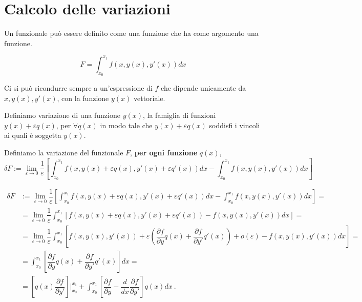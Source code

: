 
\chapter{Calcolo delle variazioni}

\begin{definition}[Funzionale] Un funzionale può essere definito come una funzione che ha come argomento una funzione.
\end{definition}

\begin{definition}
\begin{equation}
    F = \int_{x_0}^{x_1} f(x, y(x), y'(x)) dx
\end{equation}
\end{definition}

\noindent
{\color{red}
Ci si può ricondurre sempre a un'espressione di $f$ che dipende unicamente da $x, y(x), y'(x)$, con la funzione $y(x)$ vettoriale.
}

\begin{definition} Definiamo variazione di una funzione $y(x)$, la famiglia di funzioni $y(x) + \varepsilon q(x)$, per $\forall q(x)$ in modo tale che $y(x) + \varepsilon q(x)$ soddisfi i vincoli ai quali è soggetta $y(x)$.
\end{definition}

\begin{definition}
Definiamo la variazione del funzionale $F$, \textbf{per ogni funzione} $q(x)$,
\begin{equation}
    \delta F := \lim_{\varepsilon \rightarrow 0} \dfrac{1}{\varepsilon} \left[ \int_{x_0}^{x_1} f(x, y(x)+\varepsilon q(x), y'(x)+\varepsilon q'(x)) dx - \int_{x_0}^{x_1} f(x, y(x), y'(x)) dx \right] 
\end{equation}
\end{definition}
{\small
\begin{equation}
\begin{aligned}
    \delta F & := \lim_{\varepsilon \rightarrow 0} \dfrac{1}{\varepsilon} \left[ \int_{x_0}^{x_1} f(x, y(x)+\varepsilon q(x), y'(x)+\varepsilon q'(x)) dx - \int_{x_0}^{x_1} f(x, y(x), y'(x)) dx \right] = \\
     & = \lim_{\varepsilon \rightarrow 0} \dfrac{1}{\varepsilon} \int_{x_0}^{x_1} \left[  f(x, y(x)+\varepsilon q(x), y'(x)+\varepsilon q'(x)) - f(x, y(x), y'(x)) dx \right] = \\
     & = \lim_{\varepsilon \rightarrow 0} \dfrac{1}{\varepsilon} \int_{x_0}^{x_1} \left[  f(x, y(x), y'(x)) + \varepsilon \left( \dfrac{\partial f}{\partial y} q(x) + \dfrac{\partial f}{\partial y'} q'(x) \right) + o(\varepsilon) - f(x, y(x), y'(x)) dx \right] = \\
     & = \int_{x_0}^{x_1} \left[ \dfrac{\partial f}{\partial y} q(x) + \dfrac{\partial f}{\partial y'} q'(x) \right] dx = \\
     & = \left[ q(x) \dfrac{\partial f}{\partial y'} \right]\bigg|_{x_0}^{x_1} + \int_{x_0}^{x_1} \left[ \dfrac{\partial f}{\partial y} - \dfrac{d}{dx}\dfrac{\partial f}{\partial y'} \right] q(x) dx \ .
\end{aligned}
\end{equation}
}

